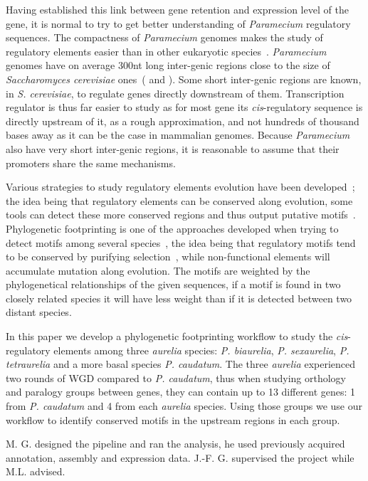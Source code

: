 Having established this link between gene retention and expression level of the gene, it is normal to try to get better understanding of \textit{Paramecium} regulatory sequences. The compactness of \textit{Paramecium} genomes makes the study of regulatory elements easier than in other eukaryotic species~\citep{mcgrath_insights_2014}. \textit{Paramecium} genomes have on average 300nt long inter-genic regions close to the size of \textit{Saccharomyces cerevisiae} ones~(\citealt{chen_minimal_2011} and \citealt{hahn_transcriptional_2011}). Some short inter-genic regions are known, in \textit{S. cerevisiae}, to regulate genes directly downstream of them. Transcription regulator is thus far easier to study as for most gene its \textit{cis}-regulatory sequence is directly upstream of it, as a rough approximation, and not hundreds of thousand bases away as it can be the case in mammalian genomes. Because \textit{Paramecium} also have very short inter-genic regions, it is reasonable to assume that their promoters share the same mechanisms.

Various strategies to study regulatory elements evolution have been developed~\citep{wittkopp_cis-regulatory_2012}; the idea being that regulatory elements can be conserved along evolution, some tools can detect these more conserved regions and thus output putative motifs~\citep{dhaeseleer_how_2006}. Phylogenetic footprinting is one of the approaches developed when trying to detect motifs among several species~\citep{zhang_mice_2003}, the idea being that regulatory motifs tend to be conserved by purifying selection~\citep{nelson_conserved_2013}, while non-functional elements will accumulate mutation along evolution. The motifs are weighted by the phylogenetical relationships of the given sequences, if a motif is found in two closely related species it will have less weight than if it is detected between two distant species.

In this paper we develop a phylogenetic footprinting workflow to study the \textit{cis}-regulatory elements among three \textit{aurelia} species: \textit{P. biaurelia}, \textit{P. sexaurelia}, \textit{P. tetraurelia} and a more basal species \textit{P. caudatum}. The three \textit{aurelia} experienced two rounds of WGD compared to \textit{P. caudatum}, thus when studying orthology and paralogy groups between genes, they can contain up to 13 different genes: 1 from \textit{P. caudatum} and 4 from each \textit{aurelia} species. Using those groups we use our workflow to identify conserved motifs in the upstream regions in each group.

M. G. designed the pipeline and ran the analysis, he used previously acquired annotation, assembly and expression data. J.-F. G. supervised the project while M.L. advised.

